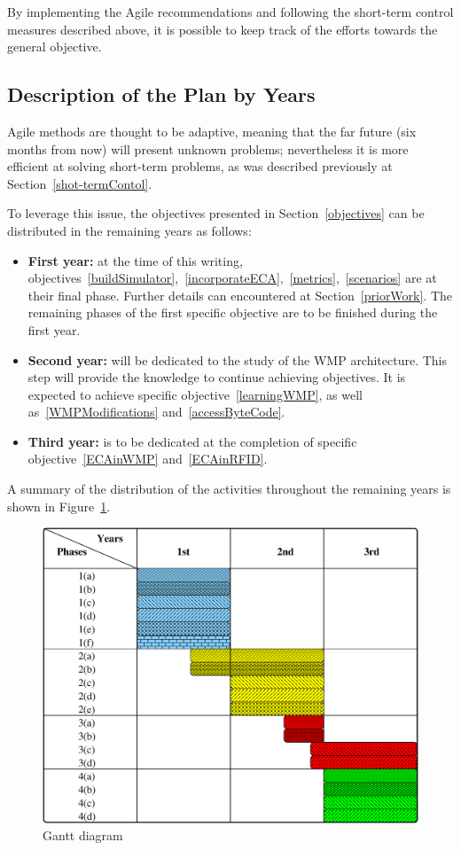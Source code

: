 By implementing the Agile recommendations and following the short-term control measures described above, it is possible to keep track of the efforts towards the general objective.

\subsection{Description of the Plan by Years}
Agile methods are thought to be adaptive, meaning that the far future (six months from now) will present unknown problems; nevertheless it is more efficient at solving short-term problems, as was described previously at Section~\ref{shot-termContol}.

To leverage this issue, the objectives presented in Section~\ref{objectives} can be distributed in the remaining years as follows:

\begin{itemize}
	\item {\bfseries First year:} at the time of this writing, objectives~\ref{buildSimulator},~\ref{incorporateECA},~\ref{metrics},~\ref{scenarios} are at their final phase. Further details can encountered at Section~\ref{priorWork}. The remaining phases of the first specific objective are to be finished during the first year.
	\item {\bfseries Second year:} will be dedicated to the study of the WMP architecture. This step will provide the knowledge to continue achieving objectives. It is expected to achieve specific objective~\ref{learningWMP}, as well as~\ref{WMPModifications} and~\ref{accessByteCode}.
	\item {\bfseries Third year:} is to be dedicated at the completion of specific objective~\ref{ECAinWMP} and~\ref{ECAinRFID}.
\end{itemize}

A summary of the distribution of the activities throughout the remaining years is shown in Figure~\ref{fig:gantt}.

\begin{figure}[htbp]
  \centering
  \includegraphics[width=0.9\linewidth]{gantt.eps}
  \caption{Gantt diagram
  \label{fig:gantt}}
\end{figure}